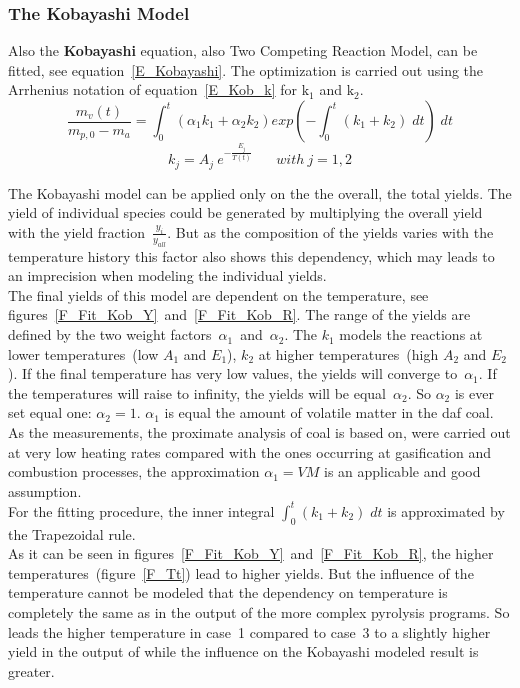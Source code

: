 \subsubsection{The Kobayashi Model}\label{SSS_Kob}

Also the \textbf{Kobayashi} equation, also Two Competing Reaction Model, can be fitted, see equation~\ref{E_Kobayashi}. The optimization is carried out using the Arrhenius notation of equation~\ref{E_Kob_k} for $\mathrm{k_1}$ and $\mathrm{k_2}$.
\begin{equation}\label{E_Kobayashi}
 \frac{m_v(t)}{m_{p,0} - m_a}= \int_{0}^{t} ( \alpha_1 k_1 + \alpha_2 k_2 ) exp \left( -  \int_{0}^{t} ( k_1 + k_2 ) \; dt \right) \; dt
\end{equation}
\begin{equation}\label{E_Kob_k}
 k_j=A_j \:e^{-\frac{E_{j}}{T(t)}} \;\;\;\;\;\; with \: j=1,2
\end{equation}

The Kobayashi model can be applied only on the the overall, the total yields. The yield of individual species could be generated by multiplying the overall yield with the yield fraction~$\frac{y_i}{y_{all}}$. But as the composition of the yields varies with the temperature history this factor also shows this dependency, which may leads to an imprecision when modeling the individual yields.\\
The final yields of this model are dependent on the temperature, see figures~\ref{F_Fit_Kob_Y}~and~\ref{F_Fit_Kob_R}. The range of the yields are defined by the two weight factors~$\alpha_1$~and~$\alpha_2$. The $k_1$ models the reactions at lower temperatures~(low $A_1$ and $E_1$), $k_2$ at higher temperatures~(high $A_2$ and $E_2$). If the final temperature has very low values, the yields will converge to~$\alpha_1$. If the temperatures will raise to infinity, the yields will be equal~$\alpha_2$. So $\alpha_2$ is ever set equal one: $\alpha_2=1$. $\alpha_1$ is equal the amount of volatile matter in the daf coal. As the measurements, the proximate analysis of coal is based on, were carried out at very low heating rates compared with the ones occurring at gasification and combustion processes, the approximation $\alpha_1=VM$ is an applicable and good assumption.\\

For the fitting procedure, the inner integral $\int_{0}^{t} ( k_1 + k_2 ) \; dt$ is approximated by the Trapezoidal rule.\\

As it can be seen in figures~\ref{F_Fit_Kob_Y}~and~\ref{F_Fit_Kob_R}, the higher temperatures~(figure~\ref{F_Tt}) lead to higher yields. But the influence of the temperature cannot be modeled that the dependency on temperature is completely the same as in the output of the more complex pyrolysis programs. So leads the higher temperature in case~1 compared to case~3 to a slightly higher yield in the output of \CPD while the influence on the Kobayashi modeled result is greater.

